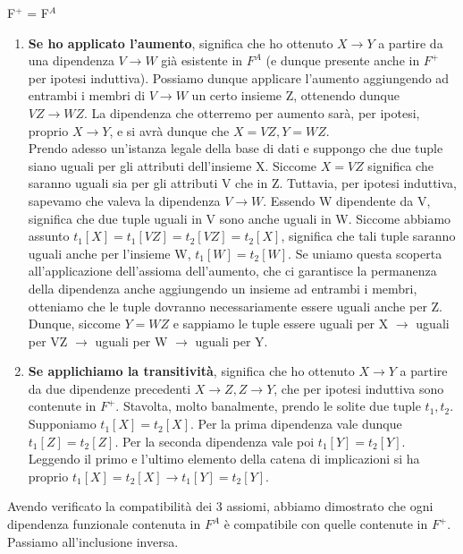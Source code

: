 \documentclass[12pt]{report}
\newcommand{\ra}{
	\rightarrow
}
\begin{document}
\begin{dimostrazione}{F$^+$ = F$^A$}{}
\begin{enumerate}
			\item \textbf{Se ho applicato l'aumento}, significa che ho ottenuto $X \ra Y$ a partire da una dipendenza $V \ra W$ già esistente in $F^A$ (e dunque presente anche in $F^+$ per ipotesi induttiva). Possiamo dunque applicare l'aumento aggiungendo ad entrambi i membri di $V \ra W$ un certo insieme Z, ottenendo dunque $VZ \ra WZ$. La dipendenza che otterremo per aumento sarà, per ipotesi, proprio $X \ra Y$, e si avrà dunque che $X = VZ, Y = WZ$.\\
			Prendo adesso un'istanza legale della base di dati e suppongo che due tuple siano uguali per gli attributi dell'insieme X. Siccome $X = VZ$ significa che saranno uguali sia per gli attributi V che in Z. Tuttavia, per ipotesi induttiva, sapevamo che valeva la dipendenza $V \ra W$. Essendo W dipendente da V, significa che due tuple uguali in V sono anche uguali in W. Siccome abbiamo assunto $t_1[X] = t_1[VZ] = t_2[VZ] = t_2[X]$, significa che tali tuple saranno uguali anche per l'insieme W, $t_1[W] = t_2[W]$. Se uniamo questa scoperta all'applicazione dell'assioma dell'aumento, che ci garantisce la permanenza della dipendenza anche aggiungendo un insieme ad entrambi i membri, otteniamo che le tuple dovranno necessariamente essere uguali anche per Z. Dunque, siccome $Y = WZ$ e sappiamo le tuple essere uguali per X $\ra$ uguali per VZ $\ra$ uguali per W $\ra$ uguali per Y.
			
			\item \textbf{Se applichiamo la transitività}, significa che ho ottenuto $X \ra Y$ a partire da due dipendenze precedenti $X \ra Z, Z \ra Y$, che per ipotesi induttiva sono contenute in $F^+$. Stavolta, molto banalmente, prendo le solite due tuple $t_1, t_2$. Supponiamo $t_1[X] = t_2[X]$. Per la prima dipendenza vale dunque $t_1[Z] = t_2[Z]$. Per la seconda dipendenza vale poi $t_1[Y] = t_2[Y]$. Leggendo il primo e l'ultimo elemento della catena di implicazioni si ha 
			proprio $t_1[X] = t_2[X] \ra t_1[Y] = t_2[Y]$.
		\end{enumerate}
		
		Avendo verificato la compatibilità dei 3 assiomi, abbiamo dimostrato che ogni dipendenza funzionale contenuta in $F^A$ è compatibile con quelle contenute in $F^+$. Passiamo all'inclusione inversa.
		

\end{dimostrazione}
\end{document}
